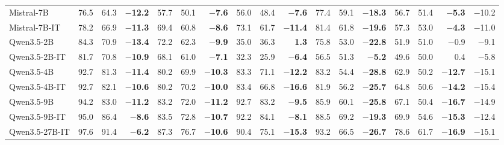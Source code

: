 \begin{table}[ht!]
{\begin{tabular}{@{}l rrr rrr rrr rrr rrr r@{}}
\addlinespace
Mistral-7B                   & 76.5 & 64.3 & \textbf{{\boldmath$-$}12.2} & 57.7 & 50.1 & \textbf{{\boldmath$-$}7.6} & 56.0 & 48.4 & \textbf{{\boldmath$-$}7.6} & 77.4 & 59.1 & \textbf{{\boldmath$-$}18.3} & 56.7 & 51.4 & \textbf{{\boldmath$-$}5.3} & $-$10.2 \\
Mistral-7B-IT                & 78.2 & 66.9 & \textbf{{\boldmath$-$}11.3} & 69.4 & 60.8 & \textbf{{\boldmath$-$}8.6} & 73.1 & 61.7 & \textbf{{\boldmath$-$}11.4} & 81.4 & 61.8 & \textbf{{\boldmath$-$}19.6} & 57.3 & 53.0 & \textbf{{\boldmath$-$}4.3} & $-$11.0 \\
\addlinespace
Qwen3.5-2B                   & 84.3 & 70.9 & \textbf{{\boldmath$-$}13.4} & 72.2 & 62.3 & \textbf{{\boldmath$-$}9.9} & 35.0 & 36.3 & \textbf{1.3} & 75.8 & 53.0 & \textbf{{\boldmath$-$}22.8} & 51.9 & 51.0 & $-$0.9 & $-$9.1 \\
Qwen3.5-2B-IT                & 81.7 & 70.8 & \textbf{{\boldmath$-$}10.9} & 68.1 & 61.0 & \textbf{{\boldmath$-$}7.1} & 32.3 & 25.9 & \textbf{{\boldmath$-$}6.4} & 56.5 & 51.3 & \textbf{{\boldmath$-$}5.2} & 49.6 & 50.0 & 0.4 & $-$5.8 \\
Qwen3.5-4B                   & 92.7 & 81.3 & \textbf{{\boldmath$-$}11.4} & 80.2 & 69.9 & \textbf{{\boldmath$-$}10.3} & 83.3 & 71.1 & \textbf{{\boldmath$-$}12.2} & 83.2 & 54.4 & \textbf{{\boldmath$-$}28.8} & 62.9 & 50.2 & \textbf{{\boldmath$-$}12.7} & $-$15.1 \\
Qwen3.5-4B-IT                & 92.7 & 82.1 & \textbf{{\boldmath$-$}10.6} & 80.2 & 70.2 & \textbf{{\boldmath$-$}10.0} & 83.4 & 66.8 & \textbf{{\boldmath$-$}16.6} & 81.9 & 56.2 & \textbf{{\boldmath$-$}25.7} & 64.8 & 50.6 & \textbf{{\boldmath$-$}14.2} & $-$15.4 \\
Qwen3.5-9B                   & 94.2 & 83.0 & \textbf{{\boldmath$-$}11.2} & 83.2 & 72.0 & \textbf{{\boldmath$-$}11.2} & 92.7 & 83.2 & \textbf{{\boldmath$-$}9.5} & 85.9 & 60.1 & \textbf{{\boldmath$-$}25.8} & 67.1 & 50.4 & \textbf{{\boldmath$-$}16.7} & $-$14.9 \\
Qwen3.5-9B-IT                & 95.0 & 86.4 & \textbf{{\boldmath$-$}8.6} & 83.5 & 72.8 & \textbf{{\boldmath$-$}10.7} & 92.2 & 84.1 & \textbf{{\boldmath$-$}8.1} & 88.5 & 69.2 & \textbf{{\boldmath$-$}19.3} & 69.9 & 54.6 & \textbf{{\boldmath$-$}15.3} & $-$12.4 \\
Qwen3.5-27B-IT               & 97.6 & 91.4 & \textbf{{\boldmath$-$}6.2} & 87.3 & 76.7 & \textbf{{\boldmath$-$}10.6} & 90.4 & 75.1 & \textbf{{\boldmath$-$}15.3} & 93.2 & 66.5 & \textbf{{\boldmath$-$}26.7} & 78.6 & 61.7 & \textbf{{\boldmath$-$}16.9} & $-$15.1 \\

\end{tabular}}
\end{table}
